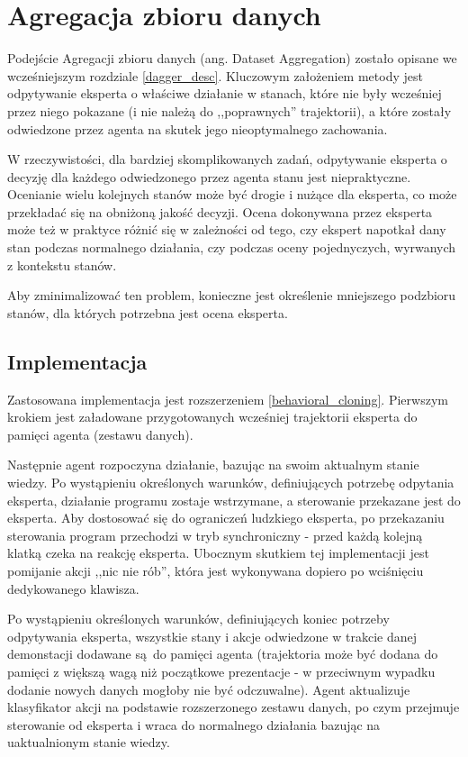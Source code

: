 \section{Agregacja zbioru danych}\label{dagger}

Podejście Agregacji zbioru danych (ang. Dataset Aggregation) \cite{DBLP:journals/corr/abs-1011-0686} zostało opisane we wcześniejszym rozdziale \ref{dagger_desc}. Kluczowym założeniem metody jest odpytywanie eksperta o właściwe działanie w stanach, które nie były wcześniej przez niego pokazane (i nie należą do ,,poprawnych'' trajektorii), a które zostały odwiedzone przez agenta na skutek jego nieoptymalnego zachowania.

W rzeczywistości, dla bardziej skomplikowanych zadań, odpytywanie eksperta o decyzję dla każdego odwiedzonego przez agenta stanu jest niepraktyczne. Ocenianie wielu kolejnych stanów może być drogie i nużące dla eksperta, co może przekładać się na obniżoną jakość decyzji. Ocena dokonywana przez eksperta może też w praktyce różnić się w zależności od tego, czy ekspert napotkał dany stan podczas normalnego działania, czy podczas oceny pojednyczych, wyrwanych z kontekstu stanów.

Aby zminimalizować ten problem, konieczne jest określenie mniejszego podzbioru stanów, dla których potrzebna jest ocena eksperta.


\subsection{Implementacja} 
Zastosowana implementacja jest rozszerzeniem \ref{behavioral_cloning}. Pierwszym krokiem jest załadowane przygotowanych wcześniej trajektorii eksperta do pamięci agenta (zestawu danych).

Następnie agent rozpoczyna działanie, bazując na swoim aktualnym stanie wiedzy. Po wystąpieniu określonych warunków, definiujących potrzebę odpytania eksperta, działanie programu zostaje wstrzymane, a sterowanie przekazane jest do eksperta. Aby dostosować się do ograniczeń ludzkiego eksperta, po przekazaniu sterowania program przechodzi w tryb synchroniczny - przed każdą kolejną klatką czeka na reakcję eksperta. Ubocznym skutkiem tej implementacji jest pomijanie akcji ,,nic nie rób'', która jest wykonywana dopiero po wciśnięciu dedykowanego klawisza.

Po wystąpieniu określonych warunków, definiujących koniec potrzeby odpytywania eksperta, wszystkie stany i akcje odwiedzone w trakcie danej demonstacji dodawane są do pamięci agenta (trajektoria może być dodana do pamięci z większą wagą niż początkowe prezentacje - w przeciwnym wypadku dodanie nowych danych mogłoby nie być odczuwalne). Agent aktualizuje klasyfikator akcji na podstawie rozszerzonego zestawu danych, po czym przejmuje sterowanie od eksperta i wraca do normalnego działania bazując na uaktualnionym stanie wiedzy.

